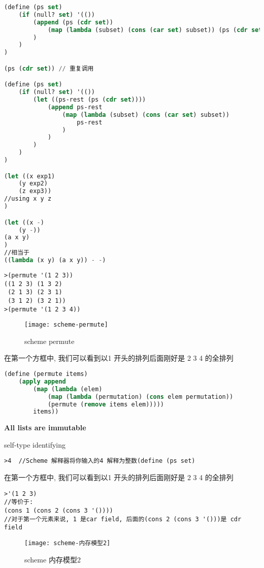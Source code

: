 \documentclass{article}
\begin{document}
\begin{lstlisting}[language = Lisp]
(define (ps set)
	(if (null? set) '(())
		(append (ps (cdr set))
			(map (lambda (subset) (cons (car set) subset)) (ps (cdr set)))
		)
	)
)

(ps (cdr set)) // 重复调用

(define (ps set)
	(if (null? set) '(())
		(let ((ps-rest (ps (cdr set))))
			(append ps-rest
				(map (lambda (subset) (cons (car set) subset))
					ps-rest
				)
			)
		)
	)
)

(let ((x exp1)
	(y exp2)
	(z exp3))
//using x y z
)

(let ((x -)
	(y -))
(a x y)
)
//相当于
((lambda (x y) (a x y)) - -)
\end{lstlisting}

\begin{verbatim}
>(permute '(1 2 3))
((1 2 3) (1 3 2)
 (2 1 3) (2 3 1)
 (3 1 2) (3 2 1))
>(permute '(1 2 3 4))
\end{verbatim}
\begin{figure}[htbp]
	\centering
	\texttt{[image: scheme-permute]}\\
	\caption{scheme permute}\label{fig.scheme.permute}
\end{figure}

在第一个方框中, 我们可以看到以1 开头的排列后面刚好是 2 3 4 的全排列

\begin{lstlisting}[language = Lisp]
(define (permute items)
	(apply append
		(map (lambda (elem)
			(map (lambda (permutation) (cons elem permutation))
			(permute (remove items elem)))))
		items))
\end{lstlisting}

\textbf{All lists are immutable}

self-type identifying
\begin{verbatim}
>4  //Scheme 解释器将你输入的4 解释为整数(define (ps set)
\end{verbatim}
在第一个方框中, 我们可以看到以1 开头的排列后面刚好是 2 3 4 的全排列

\begin{verbatim}
>'(1 2 3)
//等价于:
(cons 1 (cons 2 (cons 3 '())))
//对于第一个元素来说, 1 是car field, 后面的(cons 2 (cons 3 '()))是 cdr field
\end{verbatim}
\begin{figure}[htbp]
	\centering
	\texttt{[image: scheme-内存模型2]}\\
	\caption{scheme 内存模型2}\label{fig.scheme.内存模型2}
\end{figure}
\end{document}
